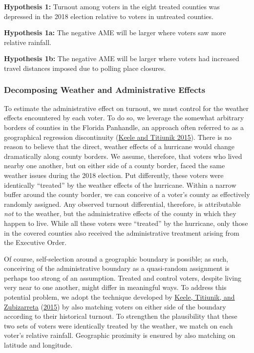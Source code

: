 \documentclass[
  12pt,
]{article}
\begin{document}
\textbf{Hypothesis 1:} Turnout among voters in the eight treated counties was depressed in the 2018 election relative to voters in untreated counties.

\textbf{Hypothesis 1a:} The negative AME will be larger where voters saw more relative rainfall.

\textbf{Hypothesis 1b:} The negative AME will be larger where voters had increased travel distances imposed due to polling place closures.

\hypertarget{decomposing-weather-and-administrative-effects}{%
\subsubsection*{Decomposing Weather and Administrative Effects}\label{decomposing-weather-and-administrative-effects}}

To estimate the administrative effect on turnout, we must control for the weather effects encountered by each voter. To do so, we leverage the somewhat arbitrary borders of counties in the Florida Panhandle, an approach often referred to as a geographical regression discontinuity (\protect\hyperlink{ref-Keele2015}{Keele and Titiunik 2015}). There is no reason to believe that the direct, weather effects of a hurricane would change dramatically along county borders. We assume, therefore, that voters who lived nearby one another, but on either side of a county border, faced the same weather issues during the 2018 election. Put differently, these voters were identically ``treated'' by the weather effects of the hurricane. Within a narrow buffer around the county border, we can conceive of a voter's county as effectively randomly assigned. Any observed turnout differential, therefore, is attributable \emph{not} to the weather, but the administrative effects of the county in which they happen to live. While all these voters were ``treated'' by the hurricane, only those in the covered counties also received the administrative treatment arising from the Executive Order.

Of course, self-selection around a geographic boundary is possible; as such, conceiving of the administrative boundary as a quasi-random assignment is perhaps too strong of an assumption. Treated and control voters, despite living very near to one another, might differ in meaningful ways. To address this potential problem, we adopt the technique developed by \protect\hyperlink{ref-Keele2015a}{Keele, Titiunik, and Zubizarreta} (\protect\hyperlink{ref-Keele2015a}{2015}) by also matching voters on either side of the boundary according to their historical turnout. To strengthen the plausibility that these two sets of voters were identically treated by the weather, we match on each voter's relative rainfall. Geographic proximity is ensured by also matching on latitude and longitude.
\end{document}
